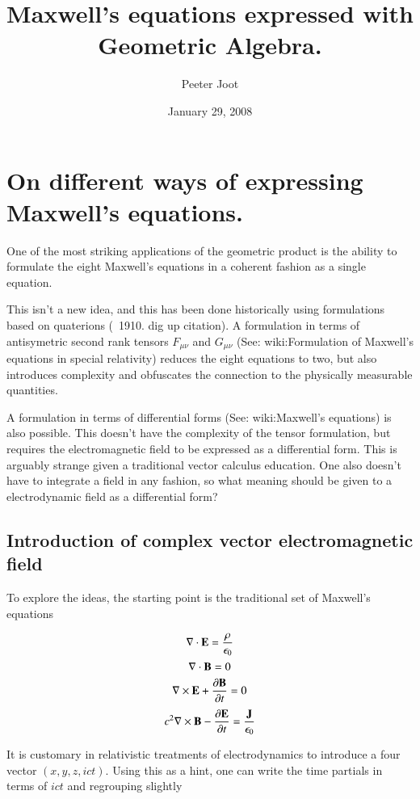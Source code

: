\documentclass{article}      %
\title{Maxwell's equations expressed with Geometric Algebra.} %
\author{Peeter Joot}         %
\date{January 29, 2008}        %
\begin{document}

\maketitle{}

\section{On different ways of expressing Maxwell's equations.}

One of the most striking applications of the geometric product is the ability to formulate the eight Maxwell's equations in a coherent fashion as a single equation.

This isn't a new idea, and this has been done historically using formulations based on quaterions (~1910.  dig up citation).  A formulation in terms of antisymetric second rank tensors $F_{\mu \nu}$ and $G_{\mu \nu}$ (See: wiki:Formulation of Maxwell's equations in special relativity) reduces the eight equations to two, but also introduces complexity and obfuscates the connection to the physically measurable quantities.

A formulation in terms of differential forms (See: wiki:Maxwell's equations) is also possible.  This doesn't have the complexity of the tensor formulation, but requires the electromagnetic field to be expressed as a differential form.  This is arguably strange given a traditional vector calculus education.  One also doesn't have to integrate a field in any fashion, so what meaning should be given to a electrodynamic field as a differential form?

\subsection{Introduction of complex vector electromagnetic field }

To explore the ideas, the starting point is the traditional set of Maxwell's equations

\[
\nabla \cdot \mathbf{E}  = \frac {\rho} {\epsilon_0}
\]
\[
\nabla \cdot \mathbf{B}  = 0
\]
\[
\nabla \times \mathbf{E}  +\frac{\partial \mathbf{B} } {\partial t} = 0
\]
\[
c^2 \nabla \times \mathbf{B}  - \frac{\partial \mathbf{E} } {\partial t}
= \frac{\mathbf{J}}{\epsilon_0}
\]

It is customary in relativistic treatments of electrodynamics to introduce a four vector $(x, y, z, ict)$.  Using this as a hint, one can write the time partials in terms of $ict$ and regrouping slightly
\end{document}
